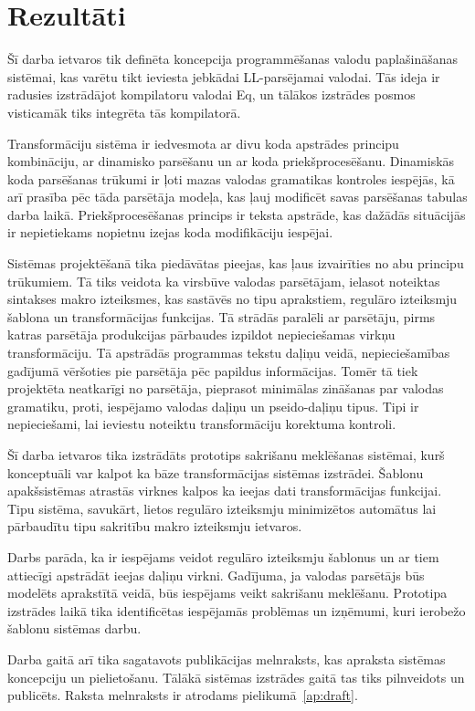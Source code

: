 \section*{Rezultāti}
\label{s:results}

Šī darba ietvaros tik definēta koncepcija programmēšanas valodu paplašināšanas sistēmai, kas varētu tikt ieviesta jebkādai LL-parsējamai valodai. Tās ideja ir radusies izstrādājot kompilatoru valodai Eq, un tālākos izstrādes posmos visticamāk tiks integrēta tās kompilatorā. 

Transformāciju sistēma ir iedvesmota ar divu koda apstrādes principu kombināciju, ar dinamisko parsēšanu un ar koda priekšprocesēšanu. Dinamiskās koda parsēšanas trūkumi ir ļoti mazas valodas gramatikas kontroles iespējās, kā arī prasība pēc tāda parsētāja modeļa, kas ļauj modificēt savas parsēšanas tabulas darba laikā. Priekšprocesēšanas princips ir teksta apstrāde, kas dažādās situācijās ir nepietiekams nopietnu izejas koda modifikāciju iespējai.

Sistēmas projektēšanā tika piedāvātas pieejas, kas ļaus izvairīties no abu principu trūkumiem. Tā tiks veidota ka virsbūve valodas parsētājam, ielasot noteiktas sintakses makro izteiksmes, kas sastāvēs no tipu aprakstiem, regulāro izteiksmju šablona un transformācijas funkcijas. Tā strādās paralēli ar parsētāju, pirms katras parsētāja produkcijas pārbaudes izpildot nepieciešamas virkņu transformāciju. Tā apstrādās programmas tekstu daļiņu veidā, nepieciešamības gadījumā vēršoties pie parsētāja pēc papildus informācijas. Tomēr tā tiek projektēta neatkarīgi no parsētāja, pieprasot minimālas zināšanas par valodas gramatiku, proti, iespējamo valodas daļiņu un pseido-daļiņu tipus. Tipi ir nepieciešami, lai ieviestu noteiktu transformāciju korektuma kontroli.

Šī darba ietvaros tika izstrādāts prototips sakrišanu meklēšanas sistēmai, kurš konceptuāli var kalpot ka bāze transformācijas sistēmas izstrādei. Šablonu apakšsistēmas atrastās virknes kalpos ka ieejas dati transformācijas funkcijai. Tipu sistēma, savukārt, lietos regulāro izteiksmju minimizētos automātus lai pārbaudītu tipu sakritību makro izteiksmju ietvaros.

Darbs parāda, ka ir iespējams veidot regulāro izteiksmju šablonus un ar tiem attiecīgi apstrādāt ieejas daļiņu virkni. Gadījuma, ja valodas parsētājs būs modelēts aprakstītā veidā, būs iespējams veikt sakrišanu meklēšanu.
Prototipa izstrādes laikā tika identificētas iespējamās problēmas un izņēmumi, kuri ierobežo šablonu sistēmas darbu.

Darba gaitā arī tika sagatavots publikācijas melnraksts, kas apraksta sistēmas koncepciju un pielietošanu. Tālākā sistēmas izstrādes gaitā tas tiks pilnveidots un publicēts. Raksta melnraksts ir atrodams pielikumā~\ref{ap:draft}.
